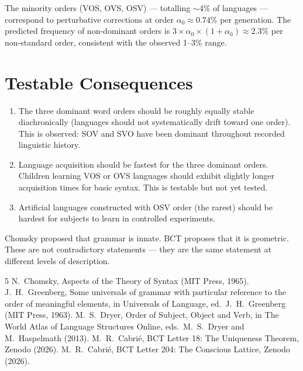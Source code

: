 \documentclass[aps,prl,twocolumn,superscriptaddress]{revtex4-2}
\begin{document}
The minority orders (VOS, OVS, OSV) --- totalling $\sim$4\% of languages --- correspond to perturbative corrections at order $\alpha_0 \approx 0.74\%$ per generation. The predicted frequency of non-dominant orders is $3 \times \alpha_0 \times (1 + \alpha_0) \approx 2.3\%$ per non-standard order, consistent with the observed 1--3\% range.

\section{Testable Consequences}

\begin{enumerate}
\item The three dominant word orders should be roughly equally stable diachronically (languages should not systematically drift toward one order). This is observed: SOV and SVO have been dominant throughout recorded linguistic history.
\item Language acquisition should be fastest for the three dominant orders. Children learning VOS or OVS languages should exhibit slightly longer acquisition times for basic syntax. This is testable but not yet tested.
\item Artificial languages constructed with OSV order (the rarest) should be hardest for subjects to learn in controlled experiments.
\end{enumerate}

\begin{acknowledgments}
Chomsky proposed that grammar is innate. BCT proposes that it is geometric. These are not contradictory statements --- they are the same statement at different levels of description.
\end{acknowledgments}

\begin{thebibliography}{5}
 N.~Chomsky, Aspects of the Theory of Syntax (MIT Press, 1965).
 J.~H.~Greenberg, Some universals of grammar with particular reference to the order of meaningful elements, in Universals of Language, ed.\ J.~H.~Greenberg (MIT Press, 1963).
 M.~S.~Dryer, Order of Subject, Object and Verb, in The World Atlas of Language Structures Online, eds.\ M.~S.~Dryer and M.~Haspelmath (2013).
 M.~R.~Cabri\'e, BCT Letter 18: The Uniqueness Theorem, Zenodo (2026).
 M.~R.~Cabri\'e, BCT Letter 204: The Conscious Lattice, Zenodo (2026).
\end{thebibliography}
\end{document}
